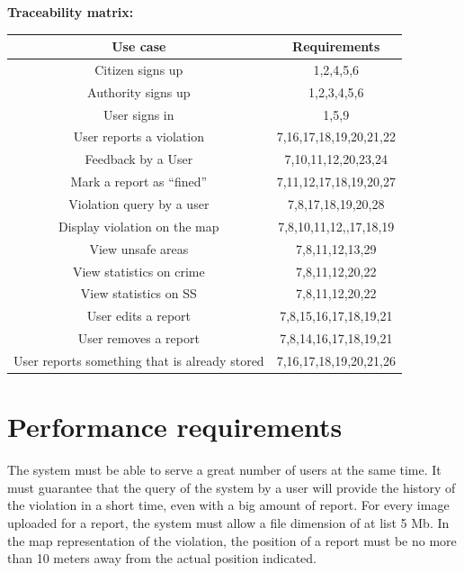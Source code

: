 \documentclass[../RASD.tex]{subfiles}
\begin{document}
                \textbf{Traceability matrix:}
                \begin{center}
                    \begin{tabular}{ ||c||c|| }

                        \hline
                        \textbf{Use case} & \textbf{Requirements}  \\ \hline
                        [\textbf{1}] Citizen signs up & 1,2,4,5,6 \\ \hline
                        [\textbf{2}] Authority signs up & 1,2,3,4,5,6\\ \hline
                        [\textbf{3}] User signs in & 1,5,9\\ \hline
                        [\textbf{4}] User reports a violation & 7,16,17,18,19,20,21,22\\ \hline
                        [\textbf{5}] Feedback by a User & 7,10,11,12,20,23,24\\ \hline
                        [\textbf{6}] Mark a report as “fined” & 7,11,12,17,18,19,20,27\\ \hline
                        [\textbf{7}] Violation query by a user & 7,8,17,18,19,20,28\\ \hline
                        [\textbf{8}] Display violation on the map & 7,8,10,11,12,,17,18,19\\ \hline
                        [\textbf{9}] View unsafe areas & 7,8,11,12,13,29\\ \hline
                        [\textbf{10}] View statistics on crime & 7,8,11,12,20,22\\ \hline
                        [\textbf{11}] View statistics on SS & 7,8,11,12,20,22\\ \hline
                        [\textbf{12}] User edits a report & 7,8,15,16,17,18,19,21\\ \hline
                        [\textbf{13}] User removes a report & 7,8,14,16,17,18,19,21\\ \hline
                        [\textbf{14}] User reports something that is already stored & 7,16,17,18,19,20,21,26\\ \hline
                    \end{tabular}
                \end{center}
    \newpage
        \section{Performance requirements}\label{sec:performance-requirements}
        The system must be able to serve a great number of users at the same time. It must guarantee that the query of the system by a user will provide the history of the violation in a short time, even with a big amount of report. For every image uploaded for a report, the system must allow a file dimension of at list 5 Mb. In the map representation of the violation, the position of a report must be no more than 10 meters away from the actual position indicated.
\end{document}
